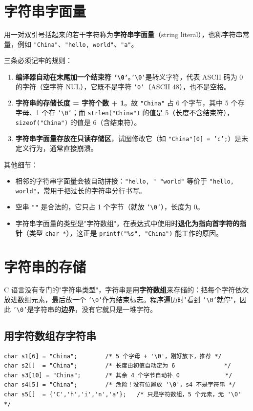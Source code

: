 \providecommand{\nul}{\texttt{'\textbackslash0'}}

\section{字符串字面量}
用一对双引号括起来的若干字符称为\textbf{字符串字面量}（string literal），也称字符串常量，例如 \texttt{"China"}、\texttt{"hello, world"}、\texttt{"a"}。

三条必须记牢的规则：
\begin{enumerate}
  \item \textbf{编译器自动在末尾加一个结束符 \nul}。\nul 是转义字符，代表 ASCII 码为 0 的字符（空字符 NUL），它既不是字符 \texttt{'0'}（ASCII 48），也不是空格。
  \item \textbf{字符串的存储长度 = 字符个数 + 1}。故 \texttt{"China"} 占 6 个字节，其中 5 个存字母、1 个存 \nul；而 \texttt{strlen("China")} 的值是 5（长度不含结束符），\texttt{sizeof("China")} 的值是 6（含结束符）。
  \item \textbf{字符串字面量存放在只读存储区}，试图修改它（如 \texttt{"China"[0] = 'c';}）是未定义行为，通常直接崩溃。
\end{enumerate}

其他细节：
\begin{itemize}
  \item 相邻的字符串字面量会被自动拼接：\texttt{"hello, " "world"} 等价于 \texttt{"hello, world"}，常用于把过长的字符串分行书写。
  \item 空串 \texttt{""} 是合法的，它只占 1 个字节（就放 \nul），长度为 0。
  \item 字符串字面量的类型是"字符数组"，在表达式中使用时\textbf{退化为指向首字符的指针}（类型 \texttt{char *}），这正是 \texttt{printf("\%s", "China")} 能工作的原因。
\end{itemize}

\section{字符串的存储}
C 语言没有专门的"字符串类型"，字符串是用\textbf{字符数组}来存储的：把每个字符依次放进数组元素，最后放一个 \nul 作为结束标志。程序遍历时"看到 \nul 就停"，因此 \nul 是字符串的\textbf{边界}，没有它就只是一堆字符。

\subsection{用字符数组存字符串}
\begin{lstlisting}
char s1[6] = "China";        /* 5 个字母 + '\0'，刚好放下，推荐 */
char s2[]  = "China";        /* 长度由初值自动定为 6              */
char s3[10] = "China";       /* 其余 4 个字节自动补 0             */
char s4[5] = "China";        /* 危险！没有位置放 '\0'，s4 不是字符串 */
char s5[]  = {'C','h','i','n','a'};   /* 只是字符数组，5 个元素，无 '\0' */
\end{lstlisting}

